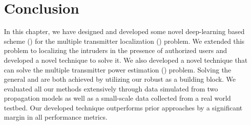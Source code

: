 \section{Conclusion}

In this chapter, we have designed and developed some novel deep-learning based scheme (\our) for
the multiple transmitter localization (\mtl) problem.
We extended this problem to localizing the intruders in the presence of authorized users and developed a novel technique to solve it. 
We also developed a novel technique that can solve the multiple transmitter power estimation (\mtpe) problem.
Solving the general \mtl and \mtpe are both achieved by utilizing our robust \our as a building block. 
We evaluated all our methods extensively through data simulated from two propagation models as well as a small-scale data collected from a real world testbed. 
Our developed technique outperforms prior approaches by a significant margin in all performance metrics.


